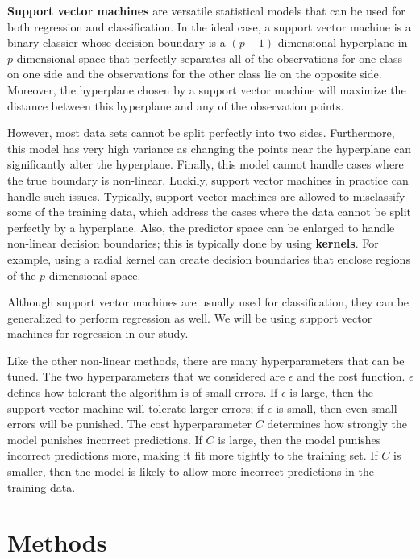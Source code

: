 \documentclass{article}
\begin{document}
\textbf{Support vector machines} are versatile statistical models that can be used for both regression and classification. In the ideal case, a support vector machine is a binary classier whose decision boundary is a $(p-1)$-dimensional hyperplane in $p$-dimensional space that perfectly separates all of the observations for one class on one side and the observations for the other class lie on the opposite side. Moreover, the hyperplane chosen by a support vector machine will maximize the distance between this hyperplane and any of the observation points.

However, most data sets cannot be split perfectly into two sides. Furthermore, this model has very high variance as changing the points near the hyperplane can significantly alter the hyperplane. Finally, this model cannot handle cases where the true boundary is non-linear. Luckily, support vector machines in practice can handle such issues. Typically, support vector machines are allowed to misclassify some of the training data, which address the cases where the data cannot be split perfectly by a hyperplane. Also, the predictor space can be enlarged to handle non-linear decision boundaries; this is typically done by using \textbf{kernels}. For example, using a radial kernel can create decision boundaries that enclose regions of the $p$-dimensional space.

Although support vector machines are usually used for classification, they can be generalized to perform regression as well. We will be using support vector machines for regression in our study.

Like the other non-linear methods, there are many hyperparameters that can be tuned. The two hyperparameters that we considered are $\epsilon$ and the cost function. $\epsilon$ defines how tolerant the algorithm is of small errors. If $\epsilon$ is large, then the support vector machine will tolerate larger errors; if $\epsilon$ is small, then even small errors will be punished. The cost hyperparameter $C$ determines how strongly the model punishes incorrect predictions. If $C$ is large, then the model punishes incorrect predictions more, making it fit more tightly to the training set. If $C$ is smaller, then the model is likely to allow more incorrect predictions in the training data.

\section{Methods}
\end{document}
